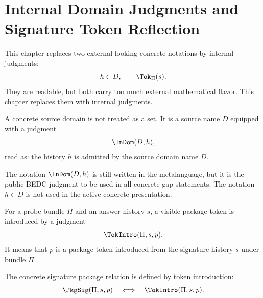 \chapter{Internal Domain Judgments and Signature Token Reflection}
\label{sec:concrete-hardening-domain-token-reflection}

This chapter replaces two external-looking concrete notations by internal judgments:
$$
  h\in D,
  \qquad
  \Tok_{\Pi}(s).
$$
They are readable, but both carry too much external mathematical flavor. This chapter replaces them with internal judgments.

\begin{definition}
\label{def:internal-domain-judgment}
A concrete source domain is not treated as a set. It is a source name \(D\) equipped with a judgment
$$
  \InDom(D,h),
$$
read as: the history \(h\) is admitted by the source domain name \(D\).
\end{definition}

\begin{remark}
The notation \(\InDom(D,h)\) is still written in the metalanguage, but it is the public BEDC judgment to be used in all concrete gap statements. The notation \(h\in D\) is not used in the active concrete presentation.
\end{remark}

\begin{definition}
\label{def:signature-token-introduction}
For a probe bundle \(\Pi\) and an answer history \(s\), a visible package token is introduced by a judgment
$$
  \TokIntro(\Pi,s,p).
$$
It means that \(p\) is a package token introduced from the signature history \(s\) under bundle \(\Pi\).
\end{definition}

\begin{definition}
\label{def:concrete-signature-package}
The concrete signature package relation is defined by token introduction:
$$
  \PkgSig(\Pi,s,p)
  \quad\Longleftrightarrow\quad
  \TokIntro(\Pi,s,p).
$$
\end{definition}

